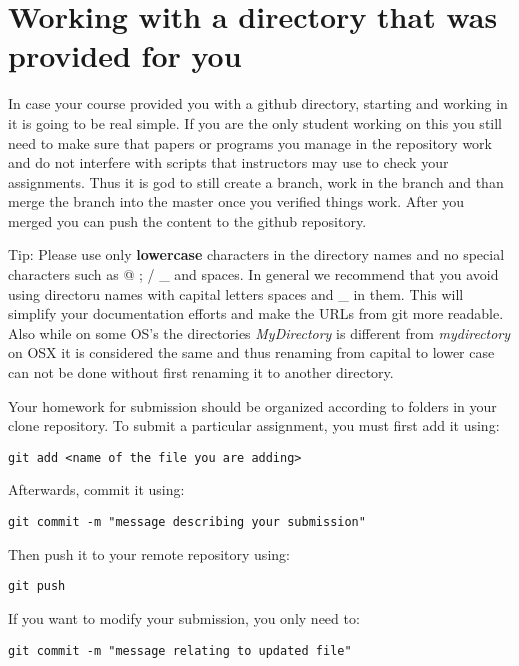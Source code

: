 \section{Working with a directory that was provided for you}

In case your course provided you with a github directory, starting and
working in it is going to be real simple. If you are the only student
working on this you still need to make sure that papers or programs
you manage in the repository work and do not interfere with scripts
that instructors may use to check your assignments. Thus it is god to
still create a branch, work in the branch and than merge the branch
into the master once you verified things work. After you merged you
can push the content to the github repository.

Tip: Please use only \textbf{lowercase} characters in the directory
names and no special characters such as @ ; / \_ and spaces. In general
we recommend that you avoid using directoru names with capital letters
spaces and \_ in them. This will simplify your documentation efforts and
make the URLs from git more readable. Also while on some OS's the
directories \textit{MyDirectory} is different from \textit{mydirectory} on OSX
it is considered the same and thus renaming from capital to lower case
can not be done without first renaming it to another directory. 


Your homework for submission should be organized according to folders in
your clone repository. To submit a particular assignment, you must first
add it using:

\begin{verbatim}
git add <name of the file you are adding>
\end{verbatim}

Afterwards, commit it using:

\begin{verbatim}
git commit -m "message describing your submission"
\end{verbatim}

Then push it to your remote repository using:

\begin{verbatim}
git push
\end{verbatim}

If you want to modify your submission, you only need to:

\begin{verbatim}
git commit -m "message relating to updated file"
\end{verbatim}

